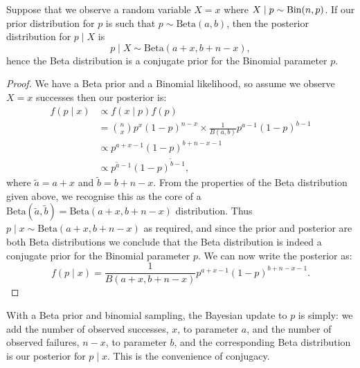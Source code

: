 \documentclass[10pt, a4paper]{article}
\begin{document}
\begin{theorem}
    Suppose that we observe a random variable $X = x$ where $X \mid p \sim \operatorname{Bin}(n, p)$.
    If our prior distribution for $p$ is such that $p \sim \mathrm{Beta}(a, b)$,
    then the posterior distribution for $p \mid X$ is
    \[
    p \mid X \sim \mathrm{Beta}(a + x, b + n - x),
    \]
    hence the Beta distribution is a conjugate prior for the Binomial parameter $p$.

    \begin{proof}
        We have a Beta prior and a Binomial likelihood,
        so assume we observe $X = x$ successes then our posterior is:
        \begin{align*}
            f(p \mid x) &\propto f(x\mid p)f(p) \\
            &= \binom{n}{x}p ^ x(1 - p) ^ {n - x} \times \frac{1}{B(a, b)}p ^ {a - 1}(1 - p) ^ {b - 1} \\
            &\propto p ^ {a + x - 1}(1 - p) ^ {b + n - x - 1} \\
            &\propto p ^ {\tilde{a} - 1}(1 - p) ^ {\tilde{b} - 1},
        \end{align*}
        where $\tilde{a} = a + x$ and $\tilde{b} = b + n - x$.
        From the properties of the Beta distribution given above,
        we recognise this as the core of a $\mathrm{Beta}(\tilde{a}, \tilde{b}) = \mathrm{Beta}(a + x, b + n - x)$ distribution.
        Thus $p \mid x \sim \mathrm{Beta}(a + x, b + n - x)$ as required,
        and since the prior and posterior are both Beta distributions we conclude that the Beta distribution is indeed a conjugate prior for the Binomial parameter $p$.
        We can now write the posterior as:
        \[
        f(p\mid x) = \frac{1}{B(a + x, b + n - x)}p ^ {a + x - 1}(1 - p) ^ {b + n - x - 1}.
        \]
    \end{proof}
\end{theorem}

With a Beta prior and binomial sampling,
the Bayesian update to $p$ is simply:
we add the number of observed successes,
$x$,
to parameter $a$,
and the number of observed failures,
$n - x$,
to parameter $b$,
and the corresponding Beta distribution is our posterior for $p \mid x$.
This is the convenience of conjugacy.
\end{document}
